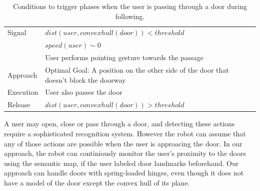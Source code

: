 \begin{table}[H]
	\centering
  \begin{tabular}{l |  m{10cm}}    
    \toprule    
    Signal & {$dist(user, convexhull(door))<threshold$}\\         
    	      & {$speed(user)\sim 0$} \\
	      & {User performs pointing gesture towards the passage}\\ \midrule	                           
    Approach & {Optimal Goal: A position on the other side of the door that doesn't block the doorway}\\       \midrule
    Execution & {User also passes the door}\\  \midrule
    Release & {$dist(user, convexhull(door))>threshold$ }\\ 
    \bottomrule
  \end{tabular}
      \caption{Conditions to trigger phases when the user is passing through a door during following.}
    \label{table:situation_aware_list_group}
\end{table}


A user may open, close or pass through a door, and detecting these actions require a sophisticated recognition system. However the robot can assume that any of those actions are possible when the user is approacing the door. In our approach, the robot can continiously monitor the user's proximity to the doors using the semantic map, if the user labeled door landmarks beforehand. Our approach can handle doors with spring-loaded hinges, even though it does not have a model of the door except the convex hull of its plane.

